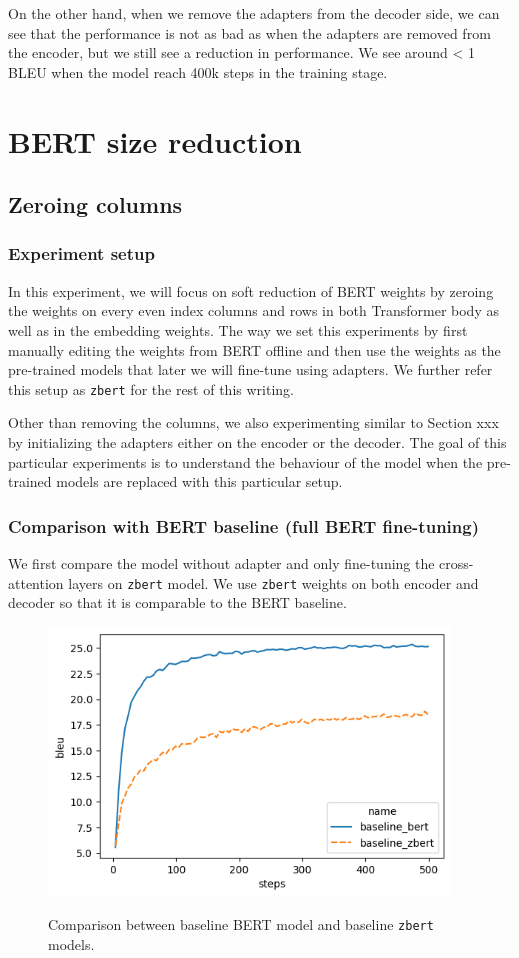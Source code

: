 On the other hand, when we remove the adapters from the decoder side, we can see that the performance is not as bad as when the adapters are removed from the encoder, but we still see a reduction in performance. We see around < 1 BLEU when the model reach 400k steps in the training stage.

\section{BERT size reduction}
\subsection{Zeroing columns}
\subsubsection{Experiment setup}
In this experiment, we will focus on soft reduction of BERT weights by zeroing the weights on every even index columns and rows in both Transformer body as well as in the embedding weights. The way we set this experiments by first manually editing the weights from BERT offline and then use the weights as the pre-trained models that later we will fine-tune using adapters. We further refer this setup as \texttt{zbert} for the rest of this writing.

Other than removing the columns, we also experimenting similar to Section xxx by initializing the adapters either on the encoder or the decoder. The goal of this particular experiments is to understand the behaviour of the model when the pre-trained models are replaced with this particular setup.

\subsubsection{Comparison with BERT baseline (full BERT fine-tuning)}
We first compare the model without adapter and only fine-tuning the cross-attention layers on \texttt{zbert} model. We use \texttt{zbert} weights on both encoder and decoder so that it is comparable to the BERT baseline.

\begin{figure}[h]
    {\includegraphics[width=0.95\textwidth]{img/baseline_zbert.png}}
    \centering
    \caption{Comparison between baseline BERT model and baseline \texttt{zbert} models.}
    \label{img:baseline_zbert}
\end{figure}

